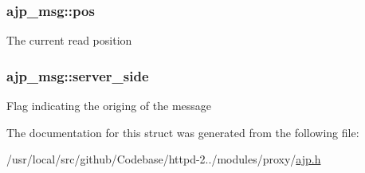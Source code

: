 \subsubsection[{\texorpdfstring{pos}{pos}}]{ ajp\+\_\+msg\+::pos}\hypertarget{structajp__msg_af2b6552360c32f52f84383d538d3df00}{}\label{structajp__msg_af2b6552360c32f52f84383d538d3df00}
The current read position 
\subsubsection[{\texorpdfstring{server\+\_\+side}{server_side}}]{ ajp\+\_\+msg\+::server\+\_\+side}\hypertarget{structajp__msg_ac7e410963f1d5bded8e7df9fe5605484}{}\label{structajp__msg_ac7e410963f1d5bded8e7df9fe5605484}
Flag indicating the origing of the message 

The documentation for this struct was generated from the following file\+:\begin{DoxyCompactItemize}
\item 
/usr/local/src/github/\+Codebase/httpd-\/2../modules/proxy/\hyperlink{ajp_8h}{ajp.\+h}\end{DoxyCompactItemize}
